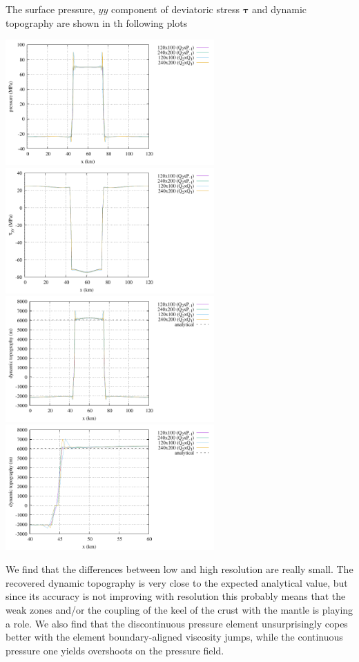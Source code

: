 The surface pressure, $yy$ component of deviatoric stress ${\bm \tau}$ 
and dynamic topography are shown in th following plots
\begin{center}
\includegraphics[width=8cm]{python_codes/fieldstone_160/results/pressure.pdf}
\includegraphics[width=8cm]{python_codes/fieldstone_160/results/tau_yy.pdf}\\
\includegraphics[width=8cm]{python_codes/fieldstone_160/results/dyn_topo.pdf}
\includegraphics[width=8cm]{python_codes/fieldstone_160/results/dyn_topo2.pdf}
\end{center}
We find that the differences between low and high resolution are really small. 
The recovered dynamic topography is very close to the expected analytical value,
but since its accuracy is not improving with resolution this probably means that the 
weak zones and/or the coupling of the keel of the crust with the mantle is 
playing a role.
We also find that the discontinuous pressure element unsurprisingly copes better 
with the element boundary-aligned viscosity jumps, while the continuous pressure 
one yields overshoots on the pressure field.

